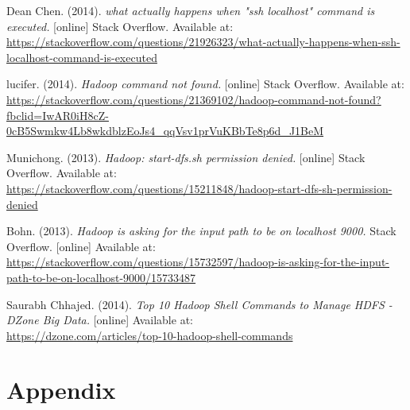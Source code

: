 \documentclass[11pt]{article}
\begin{document}
\newpage
\begin{thebibliography}{9}

Dean Chen. (2014). \textit{what actually happens when "ssh localhost" command is executed.} [online] Stack Overflow. Available at:
\\\url{https://stackoverflow.com/questions/21926323/what-actually-happens-when-ssh-localhost-command-is-executed}

lucifer. (2014). \textit{Hadoop command not found.} [online] Stack Overflow. Available at:
\\\url{https://stackoverflow.com/questions/21369102/hadoop-command-not-found?fbclid=IwAR0iH8cZ-0cB5Swmkw4Lb8wkdblzEoJs4_qqVsv1prVuKBbTe8p6d_J1BeM}

Munichong.  (2013). \textit{Hadoop: start-dfs.sh permission denied.}  [online] Stack Overflow. Available at: 
\\\url{https://stackoverflow.com/questions/15211848/hadoop-start-dfs-sh-permission-denied}

Bohn. (2013). \textit{Hadoop is asking for the input path to be on localhost 9000.} Stack Overflow. [online] Available at:
\\\url{https://stackoverflow.com/questions/15732597/hadoop-is-asking-for-the-input-path-to-be-on-localhost-9000/15733487}

Saurabh Chhajed. (2014). \textit{Top 10 Hadoop Shell Commands to Manage HDFS - DZone Big Data.} [online] Available at:
\\\url{https://dzone.com/articles/top-10-hadoop-shell-commands}

\end{thebibliography}

\newpage
\section*{Appendix}\label{sec:app}
\end{document}
